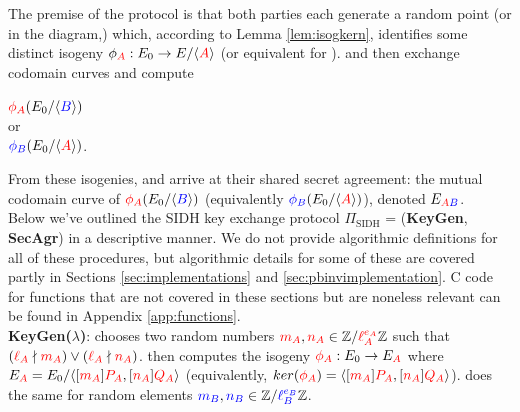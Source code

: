 \begin{center}
\end{center}

The premise of the protocol is that both parties each generate a random point (\ba or \rb in the diagram,) which, according to Lemma \ref{lem:isogkern}, identifies some distinct isogeny $\phi_{\textcolor{red}{A}}: E_0 \rightarrow E/ \langle \textcolor{red}{A} \rangle$ (or equivalent for \rb). \alice and \bob then exchange codomain curves and compute
\begin{center}
$\textcolor{red}{\phi_A}(E_0/\langle \textcolor{blue}{B} \rangle)$\\
$\text{or}$\\
$\textcolor{blue}{\phi_B}(E_0/\langle \textcolor{red}{A} \rangle)$.
\end{center}

From these isogenies, \alice and \bob arrive at their shared secret agreement: the mutual codomain curve of $\textcolor{red}{\phi_A}(E_0/\langle \textcolor{blue}{B} \rangle)$ (equivalently $\textcolor{blue}{\phi_B}(E_0/\langle \textcolor{red}{A} \rangle)$), denoted $E_{\textcolor{red}{A}\textcolor{blue}{B}}$.\\

\noindent
Below we've outlined the SIDH key exchange protocol $\Pi_{\text{SIDH}}$ = (\textbf{KeyGen}, \textbf{SecAgr}) in a descriptive manner. We do not provide algorithmic definitions for all of these procedures, but algorithmic details for some of these are covered partly in Sections \ref{sec:implementations} and \ref{sec:pbinvimplementation}. C code for functions that are not covered in these sections but are noneless relevant can be found in Appendix \ref{app:functions}.\\

\noindent
\textbf{KeyGen($\lambda$)}: \alice chooses two random numbers $\textcolor{red}{m_A}, \textcolor{red}{n_A} \in \mathbb{Z}/\textcolor{red}{\ell_{A}^{e_A}}\mathbb{Z}$ such that $(\textcolor{red}{\ell_{A}} \nmid \textcolor{red}{m_A}) \lor (\textcolor{red}{\ell_{A}} \nmid \textcolor{red}{n_A})$. \alice then computes the isogeny $\textcolor{red}{\phi_A}: E_0 \rightarrow E_{\textcolor{red}{A}}$ where $E_{\textcolor{red}{A}} = E_0 / \langle [\textcolor{red}{m_A}]\textcolor{red}{P_A}, [\textcolor{red}{n_A}]\textcolor{red}{Q_A}\rangle$ (equivalently, $ker(\textcolor{red}{\phi_A}) = \langle [\textcolor{red}{m_A}]\textcolor{red}{P_A}, [\textcolor{red}{n_A}]\textcolor{red}{Q_A}\rangle$). \bob does the same for random elements $\textcolor{blue}{m_B}, \textcolor{blue}{n_B} \in \mathbb{Z}/\textcolor{blue}{\ell_{B}^{e_B}}\mathbb{Z}$.


